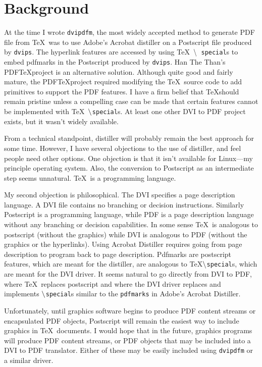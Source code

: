 \section{Background}
At the time I wrote {\tt dvipdfm},
the most widely accepted method to generate PDF file from \TeX\
was to use Adobe's Acrobat distiller on a Postscript file produced by {\tt dvips}.
The hyperlink features are accessed by using \TeX\ $\tt \backslash${\tt
special}s to embed pdfmarks in the Postscript produced by {\tt dvips}.
Han The Than's PDF\TeX project is an alternative solution.
Although quite good and fairly mature, the PDF\TeX project required
modifying the \TeX\ source code to add primitives to support the PDF features.
I have a firm belief that \TeX should remain pristine
unless a compelling case can be made that certain features cannot
be implemented with \TeX\ $\tt \backslash${\tt special}s.  At least
one other DVI to PDF project exists, but it wasn't widely available.

From a technical standpoint,
distiller will probably remain the
best approach for some time.
However, I have several objections to the use of distiller,
and feel people need other options.
One objection is that it isn't available for Linux---my principle
operating system.  Also, the conversion to Postscript as an intermediate
step seems unnatural.  \TeX\ is a programming language.

My second objection is philosophical.
The DVI specifies a page description language.
A DVI file contains no branching or decision instructions.
Similarly Postscript is a programming language, while PDF is a page description language
without any branching or decision capabilities.
In some sense \TeX\ is analogous to postscript (without the graphics)
while DVI is analogous to PDF (without the graphics or the hyperlinks).
Using Acrobat Distiller
requires going from page description to program back to page description.
Pdfmarks are postscript features, which are meant for the distiller, are
analogous to \TeX $\tt \backslash${\tt special}s, which are meant for the DVI driver.
It seems natural to go directly from DVI to PDF, where \TeX\ replaces
postscript and where the DVI driver replaces and implements
$\tt \backslash${\tt special}s similar to the {\tt pdfmarks} in Adobe's Acrobat Distiller.

Unfortunately, until graphics software
begins to produce PDF content streams or encapsulated
PDF objects, Postscript will remain the easiest
way to include graphics in \TeX\ documents.
I would hope that in the future, graphics programs
will produce PDF content streams, or PDF objects that
may be included into a DVI to PDF translator.  Either
of these may be easily included using {\tt dvipdfm}
or a similar driver.

